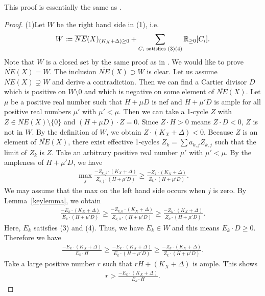 \documentclass[12pt,twoside]{amsart}
\theoremstyle{definition}
\begin{document}
This proof is essentially the same as \cite[Theorem~1.24]{KM}.


\begin{proof}
(1)Let $W$ be the right hand side in (1), i.e.
$$W:=\overline{NE}(X)_{(K_X+\Delta) \geq 0}+
\sum_{C_i\,\,{\rm satisfies}\,\,(3)(4)}\mathbb{R}_{\geq 0}[C_i].$$ 
Note that $W$ is a closed set 
by the same proof as in \cite[Ch III, Theorem 1.2]{Kollar2}. 
We would like to prove $\overline{NE}(X)=W$. 
The inclusion $\overline{NE}(X) \supset W$ is clear. 
Let us assume $\overline{NE}(X) \supsetneq W$ and 
derive a contradiction. 
Then we can find a Cartier divisor $D$ 
which is positive on $W\setminus{0}$ and 
which is negative on some element of $\overline{NE}(X)$. 
Let $\mu$ be a positive real number such that 
$H+\mu D$ is nef and $H+\mu'D$ is ample 
for all positive real numbers $\mu'$ with $\mu'<\mu$. 
Then we can take a 1-cycle $Z$ 
with $Z \in \overline{NE}(X)\setminus\{0\}$ and $(H+\mu D)\cdot Z=0$. 
Since $Z\cdot H>0$ means $Z\cdot D<0$, $Z$ is not in $W$. 
By the definition of $W$, we obtain $Z\cdot (K_X+\Delta)<0$. 
Because $Z$ is an element of $\overline{NE}(X)$, 
there exist effective 1-cycles $Z_k=\sum a_{k,j}Z_{k,j}$ such that 
the limit of $Z_k$ is $Z$. 
Take an arbitrary positive real number $\mu'$ with $\mu'<\mu$. 
By the ampleness of $H+\mu'D$, we have 
\begin{eqnarray*}
\max_j\frac{-Z_{k,j}\cdot (K_X+\Delta)}{Z_{k,j}\cdot (H+\mu'D)} \geq 
\frac{-Z_k\cdot (K_X+\Delta)}{Z_k\cdot (H+\mu'D)}.
\end{eqnarray*}
We may assume that the max on the left hand side occurs when $j$ is zero. 
By Lemma~\ref{keylemma}, we obtain 
\begin{eqnarray*}
\frac{-E_{k}\cdot (K_X+\Delta)}{E_{k}\cdot (H+\mu'D)} \geq 
\frac{-Z_{k,0}\cdot (K_X+\Delta)}{Z_{k,0}\cdot (H+\mu'D)} \geq 
\frac{-Z_k\cdot (K_X+\Delta)}{Z_k\cdot (H+\mu'D)}.
\end{eqnarray*}
Here, $E_k$ satisfies (3) and (4). 
Thus, we have $E_k \in W$ and 
this means $E_{k}\cdot D \geq 0$. 
Therefore we have 
\begin{eqnarray*}
\frac{-E_{k}\cdot (K_X+\Delta)}{E_{k}\cdot H} \geq 
\frac{-E_{k}\cdot (K_X+\Delta)}{E_{k}\cdot (H+\mu'D)} \geq 
\frac{-Z_k\cdot (K_X+\Delta)}{Z_k\cdot (H+\mu'D)}.
\end{eqnarray*}
Take a large positive number $r$ such that $rH+(K_X+\Delta)$ is ample. 
This shows 
\begin{eqnarray*}
r>\frac{-E_{k}\cdot (K_X+\Delta)}{E_{k}\cdot H}.
\end{eqnarray*}

\end{proof}
\end{document}
